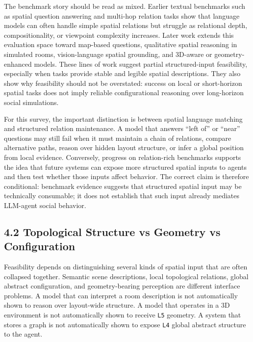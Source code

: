 \documentclass[
  twocolumn]{article}
\begin{document}
The benchmark story should be read as mixed. Earlier textual benchmarks
such as spatial question answering and multi-hop relation tasks show
that language models can often handle simple spatial relations but
struggle as relational depth, compositionality, or viewpoint complexity
increases. Later work extends this evaluation space toward map-based
questions, qualitative spatial reasoning in simulated rooms,
vision-language spatial grounding, and 3D-aware or geometry-enhanced
models. These lines of work suggest partial structured-input
feasibility, especially when tasks provide stable and legible spatial
descriptions. They also show why feasibility should not be overstated:
success on local or short-horizon spatial tasks does not imply reliable
configurational reasoning over long-horizon social simulations.

For this survey, the important distinction is between spatial language
matching and structured relation maintenance. A model that answers
``left of'' or ``near'' questions may still fail when it must maintain a
chain of relations, compare alternative paths, reason over hidden layout
structure, or infer a global position from local evidence. Conversely,
progress on relation-rich benchmarks supports the idea that future
systems can expose more structured spatial inputs to agents and then
test whether those inputs affect behavior. The correct claim is
therefore conditional: benchmark evidence suggests that structured
spatial input may be technically consumable; it does not establish that
such input already mediates LLM-agent social behavior.

\subsection{4.2 Topological Structure vs Geometry vs
Configuration}\label{topological-structure-vs-geometry-vs-configuration}

Feasibility depends on distinguishing several kinds of spatial input
that are often collapsed together. Semantic scene descriptions, local
topological relations, global abstract configuration, and
geometry-bearing perception are different interface problems. A model
that can interpret a room description is not automatically shown to
reason over layout-wide structure. A model that operates in a 3D
environment is not automatically shown to receive \texttt{L5} geometry.
A system that stores a graph is not automatically shown to expose
\texttt{L4} global abstract structure to the agent.
\end{document}
